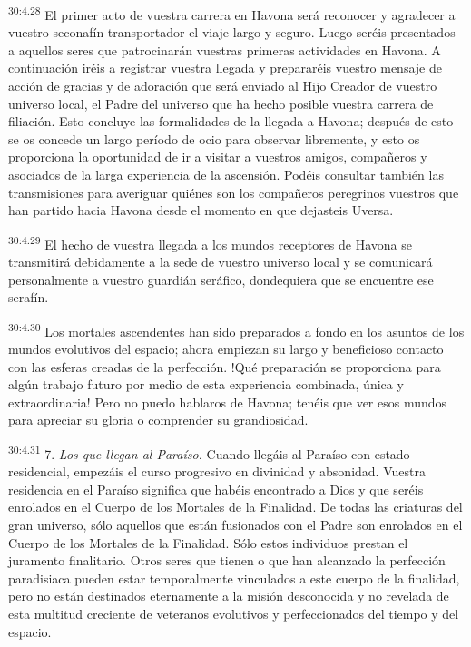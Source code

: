 \par
\textsuperscript{30:4.28} El primer acto de vuestra carrera en Havona será reconocer y agradecer a vuestro seconafín transportador el viaje largo y seguro. Luego seréis presentados a aquellos seres que patrocinarán vuestras primeras actividades en Havona. A continuación iréis a registrar vuestra llegada y prepararéis vuestro mensaje de acción de gracias y de adoración que será enviado al Hijo Creador de vuestro universo local, el Padre del universo que ha hecho posible vuestra carrera de filiación. Esto concluye las formalidades de la llegada a Havona; después de esto se os concede un largo período de ocio para observar libremente, y esto os proporciona la oportunidad de ir a visitar a vuestros amigos, compañeros y asociados de la larga experiencia de la ascensión. Podéis consultar también las transmisiones para averiguar quiénes son los compañeros peregrinos vuestros que han partido hacia Havona desde el momento en que dejasteis Uversa.

\par
\textsuperscript{30:4.29} El hecho de vuestra llegada a los mundos receptores de Havona se transmitirá debidamente a la sede de vuestro universo local y se comunicará personalmente a vuestro guardián seráfico, dondequiera que se encuentre ese serafín.

\par
\textsuperscript{30:4.30} Los mortales ascendentes han sido preparados a fondo en los asuntos de los mundos evolutivos del espacio; ahora empiezan su largo y beneficioso contacto con las esferas creadas de la perfección. !Qué preparación se proporciona para algún trabajo futuro por medio de esta experiencia combinada, única y extraordinaria! Pero no puedo hablaros de Havona; tenéis que ver esos mundos para apreciar su gloria o comprender su grandiosidad.

\par
\textsuperscript{30:4.31} 7. \textit{Los que llegan al Paraíso.} Cuando llegáis al Paraíso con estado residencial, empezáis el curso progresivo en divinidad y absonidad. Vuestra residencia en el Paraíso significa que habéis encontrado a Dios y que seréis enrolados en el Cuerpo de los Mortales de la Finalidad. De todas las criaturas del gran universo, sólo aquellos que están fusionados con el Padre son enrolados en el Cuerpo de los Mortales de la Finalidad. Sólo estos individuos prestan el juramento finalitario. Otros seres que tienen o que han alcanzado la perfección paradisiaca pueden estar temporalmente vinculados a este cuerpo de la finalidad, pero no están destinados eternamente a la misión desconocida y no revelada de esta multitud creciente de veteranos evolutivos y perfeccionados del tiempo y del espacio.

